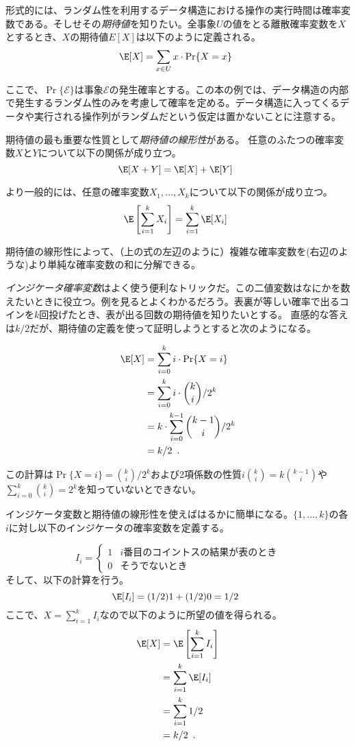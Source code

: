 形式的には、ランダム性を利用するデータ構造における操作の実行時間は確率変数である。そしせその\emph{期待値}を知りたい。全事象$U$の値をとる離散確率変数を$X$とするとき、$X$の期待値$E[X]$は以下のように定義される。
%
\[
    \E[X] = \sum_{x\in U} x\cdot\Pr\{X=x\} \enspace
\]

ここで、$\Pr\{\mathcal{E}\}$は事象$\mathcal{E}$の発生確率とする。この本の例では、データ構造の内部で発生するランダム性のみを考慮して確率を定める。データ構造に入ってくるデータや実行される操作列がランダムだという仮定は置かないことに注意する。

期待値の最も重要な性質として\emph{期待値の線形性}がある。
%
任意のふたつの確率変数$X$と$Y$について以下の関係が成り立つ。
\[
   \E[X+Y] = \E[X] + \E[Y] \enspace
\]

より一般的には、任意の確率変数$ X_1,\ldots,X_k $について以下の関係が成り立つ。
\[
   \E\left[\sum_{i=1}^k X_i\right] = \sum_{i=1}^k \E[X_i] \enspace
\]

期待値の線形性によって、（上の式の左辺のように）複雑な確率変数を(右辺のような)より単純な確率変数の和に分解できる。

\emph{インジケータ確率変数}はよく使う便利なトリックだ。この二値変数はなにかを数えたいときに役立つ。例を見るとよくわかるだろう。表裏が等しい確率で出るコインを$k$回投げたとき、表が出る回数の期待値を知りたいとする。
直感的な答えは$k/2$だが、期待値の定義を使って証明しようとすると次のようになる。

\begin{align*}
   \E[X] & = \sum_{i=0}^k i\cdot\Pr\{X=i\} \\
         & = \sum_{i=0}^k i\cdot\binom{k}{i}/2^k \\
         & = k\cdot \sum_{i=0}^{k-1}\binom{k-1}{i}/2^k \\
         & = k/2 \enspace .
\end{align*}

この計算は$\Pr\{X=i\} = \binom{k}{i}/2^k$および2項係数の性質$i\binom{k}{i}=k\binom{k-1}{i}$や$\sum_{i=0}^{k} \binom{k}{i} = 2^{k}$を知っていないとできない。

インジケータ変数と期待値の線形性を使えばはるかに簡単になる。$\{1,\ldots,k\}$の各$i$に対し以下のインジケータの確率変数を定義する。

\[
    I_i = \begin{cases}
           1 & \text{$i$番目のコイントスの結果が表のとき} \\
           0 & \text{そうでないとき}
          \end{cases}
\]
そして、以下の計算を行う。
\[ \E[I_i] = (1/2)1 + (1/2)0 = 1/2 \enspace \]
ここで、$X=\sum_{i=1}^k I_i$なので以下のように所望の値を得られる。
\begin{align*}
   \E[X] & = \E\left[\sum_{i=1}^k I_i\right] \\
         & = \sum_{i=1}^k \E[I_i] \\
         & = \sum_{i=1}^k 1/2 \\
         & = k/2 \enspace .
\end{align*}

